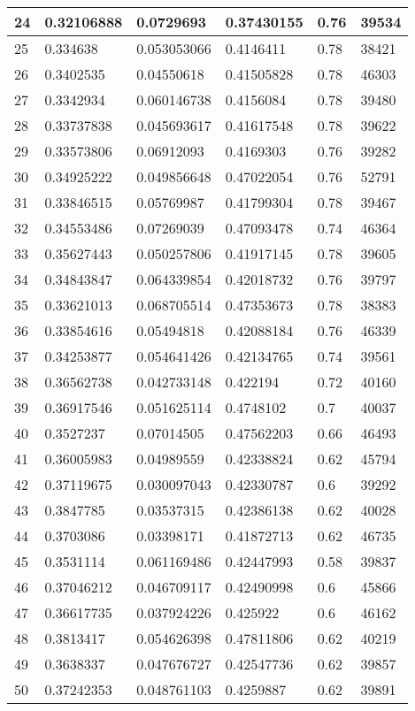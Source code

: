 \begin{longtable}{|l|l|l|l|l|l|}
24 & 0.32106888 & 0.0729693 & 0.37430155 & 0.76 & 39534 \\ \hline 
25 & 0.334638 & 0.053053066 & 0.4146411 & 0.78 & 38421 \\ \hline 
26 & 0.3402535 & 0.04550618 & 0.41505828 & 0.78 & 46303 \\ \hline 
27 & 0.3342934 & 0.060146738 & 0.4156084 & 0.78 & 39480 \\ \hline 
28 & 0.33737838 & 0.045693617 & 0.41617548 & 0.78 & 39622 \\ \hline 
29 & 0.33573806 & 0.06912093 & 0.4169303 & 0.76 & 39282 \\ \hline 
30 & 0.34925222 & 0.049856648 & 0.47022054 & 0.76 & 52791 \\ \hline 
31 & 0.33846515 & 0.05769987 & 0.41799304 & 0.78 & 39467 \\ \hline 
32 & 0.34553486 & 0.07269039 & 0.47093478 & 0.74 & 46364 \\ \hline 
33 & 0.35627443 & 0.050257806 & 0.41917145 & 0.78 & 39605 \\ \hline 
34 & 0.34843847 & 0.064339854 & 0.42018732 & 0.76 & 39797 \\ \hline 
35 & 0.33621013 & 0.068705514 & 0.47353673 & 0.78 & 38383 \\ \hline 
36 & 0.33854616 & 0.05494818 & 0.42088184 & 0.76 & 46339 \\ \hline 
37 & 0.34253877 & 0.054641426 & 0.42134765 & 0.74 & 39561 \\ \hline 
38 & 0.36562738 & 0.042733148 & 0.422194 & 0.72 & 40160 \\ \hline 
39 & 0.36917546 & 0.051625114 & 0.4748102 & 0.7 & 40037 \\ \hline 
40 & 0.3527237 & 0.07014505 & 0.47562203 & 0.66 & 46493 \\ \hline 
41 & 0.36005983 & 0.04989559 & 0.42338824 & 0.62 & 45794 \\ \hline 
42 & 0.37119675 & 0.030097043 & 0.42330787 & 0.6 & 39292 \\ \hline 
43 & 0.3847785 & 0.03537315 & 0.42386138 & 0.62 & 40028 \\ \hline 
44 & 0.3703086 & 0.03398171 & 0.41872713 & 0.62 & 46735 \\ \hline 
45 & 0.3531114 & 0.061169486 & 0.42447993 & 0.58 & 39837 \\ \hline 
46 & 0.37046212 & 0.046709117 & 0.42490998 & 0.6 & 45866 \\ \hline 
47 & 0.36617735 & 0.037924226 & 0.425922 & 0.6 & 46162 \\ \hline 
48 & 0.3813417 & 0.054626398 & 0.47811806 & 0.62 & 40219 \\ \hline 
49 & 0.3638337 & 0.047676727 & 0.42547736 & 0.62 & 39857 \\ \hline 
50 & 0.37242353 & 0.048761103 & 0.4259887 & 0.62 & 39891 \\ \hline 
\end{longtable}
